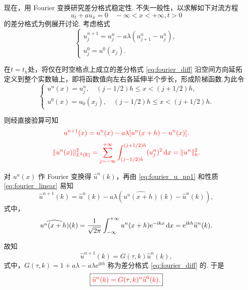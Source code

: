 现在，用 Fourier 变换研究差分格式稳定性. 不失一般性，以求解如下对流方程
\begin{equation}
    u_t + a u_x = 0 \quad -\infty < x < +\infty, t > 0
\end{equation}
的差分格式为例展开讨论. 考虑格式
\begin{equation}
    \begin{cases}
        u_j^{n+1} = u_j^n - a\lambda(u_{j+1}^n - u_j^n), \\
        u_j^0 = u^0(x_j).
    \end{cases} \label{eq:fourier_diff}
\end{equation}

\noindent{} 在$t=t_h$处，将仅在时空格点上成立的差分格式 \eqref{eq:fourier_diff} 沿空间方向延拓定义到整个实数轴上，即将函数值向左右各延伸半个步长，形成阶梯函数.为此令
\begin{equation}
    \begin{cases}
        u^n(x) = u_j^n, \quad (j - 1/2)h \leq x < (j + 1/2)h, \\
        u^0(x) = u_0(x_j), \quad (j - 1/2)h \leq x < (j + 1/2)h.
    \end{cases}
\end{equation}

则经直接验算可知
\begin{equation}
    {\color{red} u^{n+1}(x) = u^n(x) - a\lambda[u^n(x+h) - u^n(x)].} \label{eq:fourier_u_np1}
\end{equation}
\begin{equation}
    {\color{red} \|u^n(x)\|_{L^2(\mathbb{R})}^2 = \sum_{j=-\infty}^{+\infty} \int_{(j-1/2)h}^{(j+1/2)h} (u_j^n)^2 \mathop{}\!\mathrm{d}x = \|u^n\|_h^2.} \label{eq:fourier_norm}
\end{equation}

\noindent{} 对 $u^n(x)$ 作 Fourier 变换得 $\widehat{u}^n(k)$，再由 \eqref{eq:fourier_u_np1} 和性质 \eqref{eq:fourier_linear} 易知
\begin{equation*}
    \widehat{u}^{n+1}(k) = \widehat{u}^n(k) - a\lambda \left( \widehat{u^n(x+h)}(k) - \widehat{u}^n(k) \right),
\end{equation*}
式中，
\begin{equation*}
    \widehat{u^n(x+h)}(k) = \frac{1}{\sqrt{2\pi}} \int_{-\infty}^{+\infty} u^n(x+h) \mathrm{e}^{-\mathrm{i}kx} \mathop{}\!\mathrm{d} x = \mathrm{e}^{\mathrm{i}kh} \widehat{u}^n(k).
\end{equation*}

故知
\begin{equation*}
    \widehat{u}^{n+1}(k) = G(\tau, k)\widehat{u}^n(k),
\end{equation*}
式中，$G(\tau, k) = 1 + a\lambda - a\lambda \mathrm{e}^{\mathrm{i}kh}$ 称为差分格式 \eqref{eq:fourier_diff} 的. 于是
\begin{equation*}
    \boxed{ {\color{red} \widehat{u}^n(k) = G(\tau, k)^n \widehat{u}^0(k).} }
\end{equation*}

